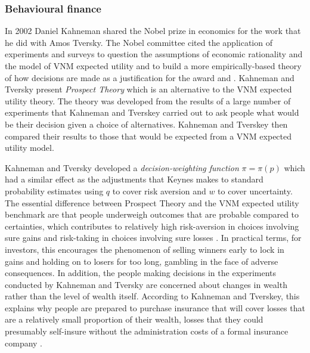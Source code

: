 \documentclass[12pt, a4paper, oneside]{article} %
\begin{document}
\subsubsection{Behavioural finance}
In 2002 Daniel Kahneman shared the Nobel prize in economics for the work that he did with Amos Tversky. The Nobel committee cited the application of experiments and surveys to question the assumptions of economic rationality and the model of VNM expected utility and to build a more empirically-based theory of how decisions are made as a justification for the award \citep{Kahneman1979Prospect} and \citep{KahnemanThinking}.  Kahneman and Tversky present \emph{Prospect Theory} which is an alternative to the VNM expected utility theory.  The theory was developed from the results of a large number of experiments that Kahneman and Tverskey carried out to ask people what would be their decision given a choice of alternatives.  Kahneman and Tverskey then compared their results to those that would be expected from a VNM expected utility model.  
 
Kahneman and Tversky developed a \emph{decision-weighting function} $\pi = \pi(p)$ which had a similar effect as the adjustments that Keynes makes to standard probability estimates using $q$ to cover risk aversion and $w$ to cover uncertainty. The essential difference between Prospect Theory and the VNM expected utility benchmark are that people underweigh outcomes that are probable compared to certainties, which contributes to relatively high risk-aversion in choices involving sure gains and risk-taking in choices involving sure losses \citep[p. 263]{Kahneman1979Prospect}.  In practical terms, for investors, this encourages the phenomenon of selling winners early to lock in gains and holding on to losers for too long, gambling in the face of adverse consequences.  In addition, the people making decisions in the experiments conducted by Kahneman and Tversky are concerned about changes in wealth rather than the level of wealth itself.  According to Kahneman and Tverskey, this explains why people are prepared to purchase insurance that will cover losses that are a relatively small proportion of their wealth, losses that they could presumably self-insure without the administration costs of a formal insurance company \citep[p. 286]{Kahneman1979Prospect}. 
\end{document}
